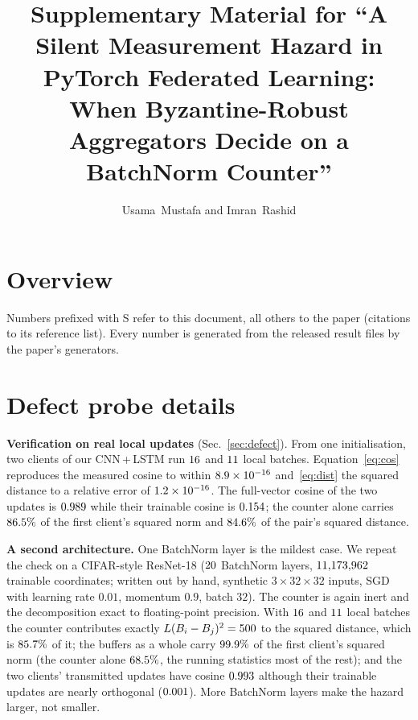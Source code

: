 \documentclass[journal]{IEEEtran}
\begin{document}
\title{Supplementary Material for ``A Silent Measurement Hazard in PyTorch
Federated Learning: When Byzantine-Robust Aggregators Decide on a BatchNorm
Counter''}
\author{Usama~Mustafa and Imran~Rashid}
\maketitle

\section{Overview}
\label{sup:overview}
Numbers prefixed with S refer to this document, all others to the paper (citations to
its reference list). Every number is generated from the released result files by the
paper's generators.

\section{Defect probe details}
\label{sup:probe}
\textbf{Verification on real local updates} (Sec.~\ref{sec:defect}). From one initialisation,
two clients of our CNN\,+\,LSTM run $16$ and $11$ local batches.
Equation~\eqref{eq:cos} reproduces the measured cosine to within
$8.9\times10^{-16}$ and~\eqref{eq:dist} the squared distance to a relative error of
$1.2\times10^{-16}$. The full-vector cosine of the two updates is
$0.989$ while their trainable cosine is $0.154$; the counter
alone carries $86.5\%$ of the first client's squared norm and
$84.6\%$ of the pair's squared distance.

\textbf{A second architecture.} One BatchNorm layer is the mildest case. We
repeat the check on a CIFAR-style ResNet-18 ($20$ BatchNorm layers,
$11{,}173{,}962$ trainable coordinates; written out by hand, synthetic
$3\times32\times32$ inputs, SGD with learning rate $0.01$, momentum $0.9$, batch
$32$). The counter is again inert and the decomposition exact to floating-point precision. With $16$ and
$11$ local batches the counter contributes exactly
$L(B_i-B_j)^2=500$ to the squared distance, which is
$85.7\%$ of it; the buffers as a whole carry $99.9\%$ of the
first client's squared norm (the counter alone $68.5\%$, the running
statistics most of the rest); and the two clients' transmitted updates have cosine
$0.993$ although their trainable updates are nearly orthogonal
($0.001$). More BatchNorm layers make the hazard larger, not smaller.
\end{document}
